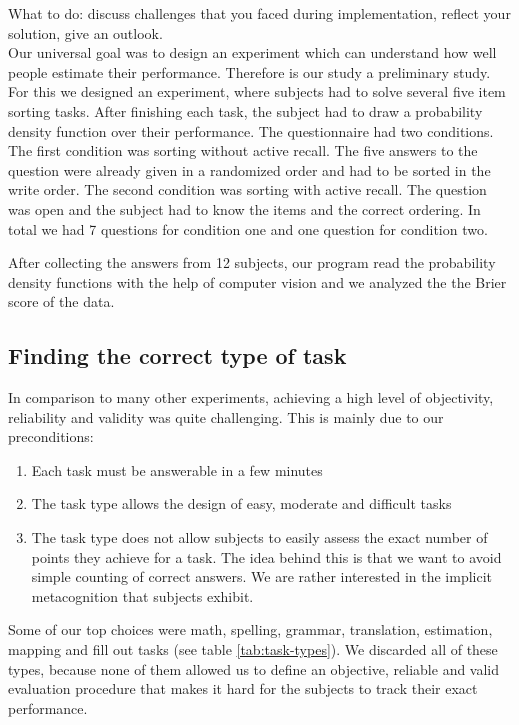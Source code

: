 \documentclass[../main/main.tex]{subfiles}
\begin{document}
	What to do: discuss challenges that you faced during implementation, reflect your solution, give an outlook.\\
	
	\noindent Our universal goal was to design an experiment which can understand how well people estimate their performance. Therefore is our study a preliminary study. For this we designed an experiment, where subjects had to solve several five item sorting tasks. After finishing each task, the subject had to draw a probability density function over their performance. The questionnaire had two conditions. The first condition was sorting without active recall. The five answers to the question were already given in a randomized order and had to be sorted in the write order. The second condition was sorting with active recall. The question was open and the subject had to know the items and the correct ordering. In total we had 7 questions for condition one and one question for condition two.
	
	After collecting the answers from 12 subjects, our program read the probability density functions with the help of computer vision and we analyzed the the Brier score of the data.
	
	\subsection{Finding the correct type of task}
	
	In comparison to many other experiments, achieving a high level of objectivity, reliability and validity was quite challenging. This is mainly due to our preconditions:
	
	\begin{enumerate}
		\item Each task must be answerable in a few minutes
		\item The task type allows the design of easy, moderate and difficult tasks
		\item The task type does not allow subjects to easily assess the exact number of points they achieve for a task. The idea behind this is that we want to avoid simple counting of correct answers. We are rather interested in the implicit metacognition that subjects exhibit. 
	\end{enumerate}

	\noindent Some of our top choices were math, spelling, grammar, translation, estimation, mapping and fill out tasks (see table \ref{tab:task-types}). We discarded all of these types, because none of them allowed us to define an objective, reliable and valid evaluation procedure that makes it hard for the subjects to track their exact performance.
	
\end{document}
